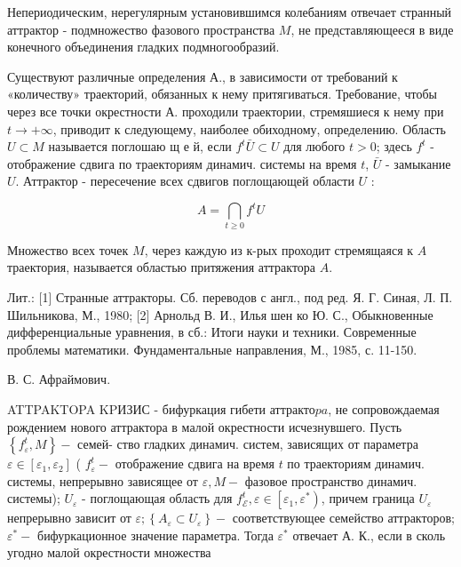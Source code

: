 \documentclass[10pt]{article}
\begin{document}
Непериодическим, нерегулярным установившимся колебаниям отвечает странный аттрактор - подмножество фазового пространства $M$, не представляющееся в виде конечного объединения гладких подмногообразий.



Существуют различные определения А., в зависимости от требований к «количеству» траекторий, обязанных к нему притягиваться. Требование, чтобы через все точки окрестности А. проходили траектории, стремяшиеся к нему при $t \rightarrow+\infty$, приводит к следующему, наиболее обиходному, определению. Область $U \subset M$ называется поглошаю щ е й, если $f^{t} \bar{U} \subset U$ для любого $t>0$; здесь $f^{t}$ - отображение сдвига по траекториям динамич. системы на время $t$, $\bar{U}$ - замыкание $U$. Аттрактор - пересечение всех сдвигов поглощающей области $U$ :



\[

A=\bigcap_{t \geqslant 0} f^{t} U

\]



Множество всех точек $M$, через каждую из к-рых проходит стремящаяся к $A$ траектория, называется областью притяжения аттрактора $A$.



Лит.: [1] Странные аттракторы. Сб. переводов с англ., под ред. Я. Г. Синая, Л. П. Шильникова, М., 1980; [2] Арнольд В. И., Илья шен ко Ю. С., Обыкновенные дифференциальные уравнения, в сб.: Итоги науки и техники. Современные проблемы математики. Фундаментальные направления, М., 1985, с. 11-150.



В. С. Афраймович.



ATTPAKTOPA KPИЗИС - бифуркация гибети аттракто$p a$, не сопровождаемая рождением нового аттрактора в малой окрестности исчезнувшего. Пусть $\left\{f_{\varepsilon}^{t}, M\right\}-$ семей- ство гладких динамич. систем, зависящих от параметра $\varepsilon \in\left[\varepsilon_{1}, \varepsilon_{2}\right]$ ( $f_{\varepsilon}^{t}-$ отображение сдвига на время $t$ по траекториям динамич. системы, непрерывно зависящее от $\varepsilon, M-$ фазовое пространство динамич. системы); $U_{\varepsilon}$ - поглощающая область для $f_{\mathcal{E}}^{t}, \varepsilon \in\left[\varepsilon_{1}, \varepsilon^{*}\right)$, причем граница $U_{\varepsilon}$ непрерывно зависит от $\varepsilon ;\left\{A_{\varepsilon} \subset U_{\varepsilon}\right\}-$ соответствующее семейство аттракторов; $\varepsilon^{*}-$ бифуркационное значение параметра. Тогда $\varepsilon^{*}$ отвечает А. К., если в сколь угодно малой окрестности множества
\end{document}
